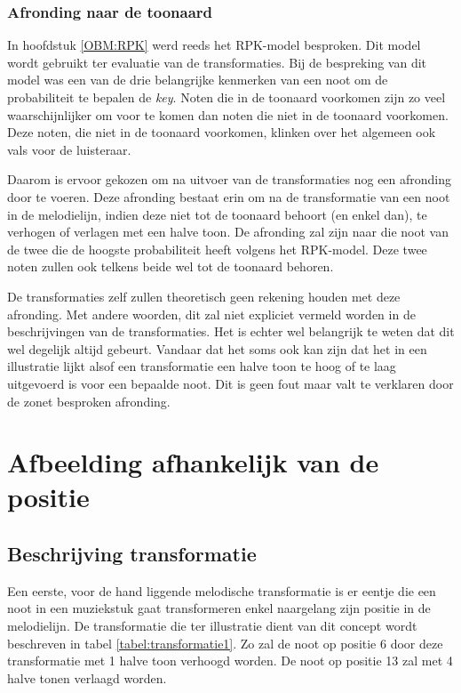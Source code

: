 \subsubsection{Afronding naar de toonaard}
\label{sub:afronding}
In hoofdstuk \ref{OBM:RPK} werd reeds het RPK-model besproken. Dit model wordt gebruikt ter evaluatie van de transformaties. Bij de bespreking van dit model was een van de drie belangrijke kenmerken van een noot om de probabiliteit te bepalen de \textit{key}. Noten die in de toonaard voorkomen zijn zo veel waarschijnlijker om voor te komen dan noten die niet in de toonaard voorkomen. Deze noten, die niet in de toonaard voorkomen, klinken over het algemeen ook vals voor de luisteraar. 

Daarom is ervoor gekozen om na uitvoer van de transformaties nog een afronding door te voeren. Deze afronding bestaat erin om na de transformatie van een noot in de melodielijn, indien deze niet tot de toonaard behoort (en enkel dan), te verhogen of verlagen met een halve toon. De afronding zal zijn naar die noot van de twee die de hoogste probabiliteit heeft volgens het RPK-model. Deze twee noten zullen ook telkens beide wel tot de toonaard behoren. 

De transformaties zelf zullen theoretisch geen rekening houden met deze afronding. Met andere woorden, dit zal niet expliciet vermeld worden in de beschrijvingen van de transformaties. Het is echter wel belangrijk te weten dat dit wel degelijk altijd gebeurt. Vandaar dat het soms ook kan zijn dat het in een illustratie lijkt alsof een transformatie een halve toon te hoog of te laag uitgevoerd is voor een bepaalde noot. Dit is geen fout maar valt te verklaren door de zonet besproken afronding.

\section{Afbeelding afhankelijk van de positie}
\label{MT:positie}
\subsection{Beschrijving transformatie}
Een eerste, voor de hand liggende melodische transformatie is er eentje die een noot in een muziekstuk gaat transformeren enkel naargelang zijn positie in de melodielijn. De transformatie die ter illustratie dient van dit concept wordt beschreven in tabel \ref{tabel:transformatie1}. Zo zal de noot op positie 6 door deze transformatie met 1 halve toon verhoogd worden. De noot op positie 13 zal met 4 halve tonen verlaagd worden. 

